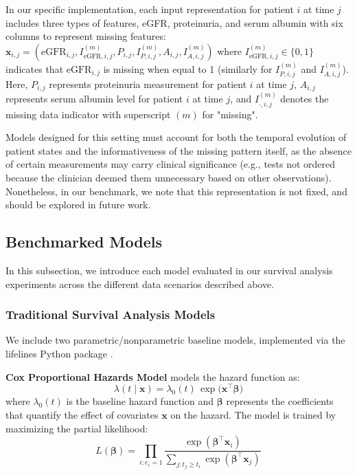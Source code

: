 In our specific implementation, each input representation for patient $i$ at time $j$ includes three types of features, eGFR, proteinuria, and serum albumin with six columns to represent missing features: $\mathbf{x}_{i,j} = (\text{eGFR}_{i,j}, I^{(m)}_{\text{eGFR},i,j}, P_{i,j}, I^{(m)}_{P,i,j}, A_{i,j}, I^{(m)}_{A,i,j})$ where $I^{(m)}_{\text{eGFR},i,j} \in \{0,1\}$ indicates that $\text{eGFR}_{i,j}$ is missing when equal to 1 (similarly for $I^{(m)}_{P,i,j}$ and $I^{(m)}_{A,i,j}$). Here, $P_{i,j}$ represents proteinuria measurement for patient $i$ at time $j$, $A_{i,j}$ represents serum albumin level for patient $i$ at time $j$, and $I^{(m)}_{\cdot,i,j}$ denotes the missing data indicator with superscript $(m)$ for "missing".




Models designed for this setting must account for both the temporal evolution of patient states and the informativeness of the missing pattern itself, as the absence of certain measurements may carry clinical significance (e.g., tests not ordered because the clinician deemed them unnecessary based on other observations). Nonetheless, in our benchmark, we note that this representation is not fixed, and should be explored in future work.

\subsection{Benchmarked Models} \label{sec:models}

In this subsection, we introduce each model evaluated in our survival analysis experiments across the different data scenarios described above.

\subsubsection{Traditional Survival Analysis Models}
We include two parametric/nonparametric baseline models, implemented via the lifelines Python package \cite{davidson2019lifelines}.

\textbf{Cox Proportional Hazards Model} \cite{cox1972regression} models the hazard function as:
\[\lambda(t \mid \mathbf{x}) = \lambda_0(t)\,\exp\bigl(\mathbf{x}^\intercal \boldsymbol{\beta}\bigr)\]
where $\lambda_0(t)$ is the baseline hazard function and $\boldsymbol{\beta}$ represents the coefficients that quantify the effect of covariates $\mathbf{x}$ on the hazard. The model is trained by maximizing the partial likelihood:
\[L(\boldsymbol{\beta}) = \prod_{i:e_i=1} \frac{\exp(\boldsymbol{\beta}^\intercal \mathbf{x}_i)}{\sum_{j:t_j \geq t_i} \exp(\boldsymbol{\beta}^\intercal \mathbf{x}_j)}\]

